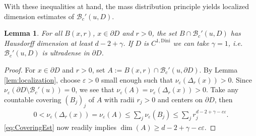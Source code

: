 \documentclass[a4paper,12pt]{article}
\newtheorem{lemma}[theorem]{Lemma}
\theoremstyle{definition}
\theoremstyle{definition}
\begin{document}
	With these inequalities at hand, the mass distribution principle yields localized dimension estimates of $\mathcal B_c'(u,D)$. 
	\begin{lemma}
		For all $B(x,r)$, $x\in\partial D$ and $r>0$, the set $B\cap\mathcal B_c'(u, D)$ has Hausdorff dimension at least $d-2+\gamma$. If $D$ is $C^{1,\mathrm{Dini}}$ we can take $\gamma=1$, i.e. $\mathcal B_c'(u, D)$ is ultradense in $\partial D$.
	\end{lemma}
	\begin{proof}
		For $x\in\partial D$ and $r>0$, set $A:=B(x,r)\cap\mathcal B_c'(u,\partial D)$. By Lemma \ref{lem:localization}, choose $\varepsilon>0$ small enough such that $\nu_\varepsilon(\Delta_r(x))>0$. Since $\nu_{\varepsilon}(\partial D\setminus \mathcal {B}_c'(u))=0$, we see that $\nu_\varepsilon(A)=\nu_\varepsilon(\Delta_r(x))>0$. Take any countable covering $(B_j)_j$ of $A$ with radii $r_j>0$ and centers on $\partial D$, then 
		\begin{align}\label{eq:CoveringEst}
			0<\nu_{\varepsilon}(\Delta_r(x))=\nu_{\varepsilon}(A)\leq\sum_j\nu_\varepsilon(B_j)\leq\sum_jr_j^{d-2+\gamma-c\varepsilon}.
		\end{align}
		\eqref{eq:CoveringEst} now readily implies $\dim(A)\geq d-2+\gamma-c\varepsilon$.
	\end{proof}
	
		
\end{document}
